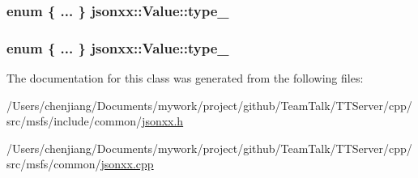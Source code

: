 \subsubsection[{type\+\_\+}]{\setlength{\rightskip}{0pt plus 5cm}enum \{ ... \}   jsonxx\+::\+Value\+::type\+\_\+}\label{classjsonxx_1_1_value_a3424e98c4835ecb2d6bfe096bf930d4c}
\hypertarget{classjsonxx_1_1_value_a3a22b72806eb7e7ea76a388a0661d0fa}{}
\subsubsection[{type\+\_\+}]{\setlength{\rightskip}{0pt plus 5cm}enum \{ ... \}   jsonxx\+::\+Value\+::type\+\_\+}\label{classjsonxx_1_1_value_a3a22b72806eb7e7ea76a388a0661d0fa}


The documentation for this class was generated from the following files\+:\begin{DoxyCompactItemize}
\item 
/\+Users/chenjiang/\+Documents/mywork/project/github/\+Team\+Talk/\+T\+T\+Server/cpp/src/msfs/include/common/\hyperlink{msfs_2include_2common_2jsonxx_8h}{jsonxx.\+h}\item 
/\+Users/chenjiang/\+Documents/mywork/project/github/\+Team\+Talk/\+T\+T\+Server/cpp/src/msfs/common/\hyperlink{msfs_2common_2jsonxx_8cpp}{jsonxx.\+cpp}\end{DoxyCompactItemize}
